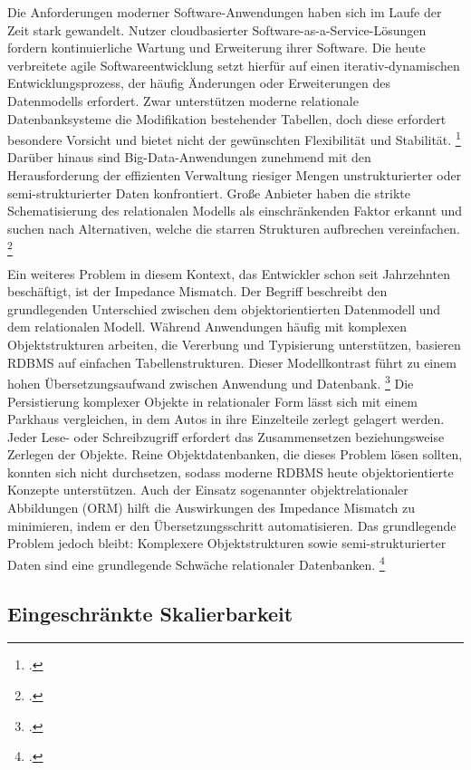 Die Anforderungen moderner Software-Anwendungen haben sich im Laufe der Zeit stark gewandelt. Nutzer cloudbasierter Software-as-a-Service-Lösungen fordern kontinuierliche Wartung und Erweiterung ihrer Software. Die heute verbreitete agile Softwareentwicklung setzt hierfür auf einen iterativ-dynamischen Entwicklungsprozess, der häufig  Änderungen oder Erweiterungen des Datenmodells erfordert. Zwar unterstützen moderne relationale Datenbanksysteme die Modifikation bestehender Tabellen, doch diese erfordert besondere Vorsicht und bietet nicht der gewünschten Flexibilität und Stabilität. \footcite[S. 197]{harrisonNextGenerationDatabases2015} Darüber hinaus sind Big-Data-Anwendungen zunehmend mit den Herausforderung der effizienten Verwaltung riesiger Mengen unstrukturierter oder semi-strukturierter Daten konfrontiert. Große Anbieter haben die strikte Schematisierung des relationalen Modells als einschränkenden Faktor erkannt und suchen nach Alternativen, welche die starren Strukturen aufbrechen vereinfachen. \footcite[S. 175]{chenBigDataSurvey2014}


Ein weiteres Problem in diesem Kontext, das Entwickler schon seit Jahrzehnten beschäftigt, ist der Impedance Mismatch. Der Begriff beschreibt den grundlegenden Unterschied zwischen dem objektorientierten Datenmodell und dem relationalen Modell. Während Anwendungen häufig mit komplexen Objektstrukturen arbeiten, die Vererbung und Typisierung unterstützen, basieren RDBMS auf einfachen Tabellenstrukturen. Dieser Modellkontrast führt zu einem hohen Übersetzungsaufwand zwischen Anwendung und Datenbank. \footcite{newardVietnamComputerScience2006} Die Persistierung komplexer Objekte in relationaler Form lässt sich mit einem Parkhaus vergleichen, in dem Autos in ihre Einzelteile zerlegt gelagert werden. Jeder Lese- oder Schreibzugriff erfordert das Zusammensetzen beziehungsweise Zerlegen der Objekte. Reine Objektdatenbanken, die dieses Problem lösen sollten, konnten sich nicht durchsetzen, sodass moderne RDBMS heute objektorientierte Konzepte unterstützen. Auch der Einsatz sogenannter objektrelationaler Abbildungen (ORM) hilft die Auswirkungen des Impedance Mismatch zu minimieren, indem er den Übersetzungsschritt automatisieren. Das grundlegende Problem jedoch bleibt: Komplexere Objektstrukturen sowie semi-strukturierter Daten sind eine grundlegende Schwäche relationaler Datenbanken. \footcite[S. 13]{harrisonNextGenerationDatabases2015}

\subsection{Eingeschränkte Skalierbarkeit}

